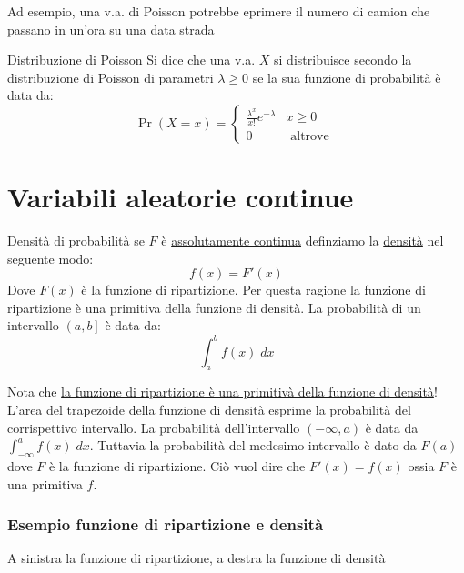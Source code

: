 Ad esempio, una v.a. di Poisson potrebbe eprimere il numero di camion che passano in un'ora su una data strada
\begin{definizione}{Distribuzione di Poisson}
	Si dice che una v.a. $ X $ si distribuisce secondo la distribuzione di Poisson di parametri $ \lambda \ge 0 $ se la sua funzione di probabilità è data da:
	\[
		\Pr \left(X = x\right) =
		\begin{cases}
			\displaystyle \frac{\lambda ^{x}}{x!} e^{-\lambda } & x \ge 0          \\
			0                                                   & \text{ altrove }
		\end{cases}
	\]
\end{definizione}
\section{Variabili aleatorie continue}
\begin{definizione}{Densità di probabilità}
	se $ F $ è \underline{assolutamente continua} definziamo la \underline{densità} nel seguente modo:
	\[
		f\left(x\right) = F'\left(x\right)
	\]
	Dove $ F\left(x\right) $ è la funzione di ripartizione. Per questa ragione la funzione di ripartizione è una primitiva della funzione di densità. La probabilità di un intervallo $ \left(a, b\right] $ è data da:
	\[
		\int_{a}^{b} f(x) \; dx
	\]
\end{definizione}
Nota che \underline{la funzione di ripartizione è una primitivà della funzione di densità}! L'area del trapezoide della funzione di densità esprime la probabilità del corrispettivo intervallo. La probabilità dell'intervallo $ \left(-\infty, a\right) $ è data da $ \int_{-\infty }^{a} f(x) \; dx $. Tuttavia la probabilità del medesimo intervallo è dato da $ F\left(a\right) $ dove $ F $ è la funzione di ripartizione. Ciò vuol dire che $ F'\left(x\right) = f\left(x\right) $ ossia $ F $ è una primitiva $ f $.
\vskip3mm
\subsubsection*{Esempio funzione di ripartizione e densità}
A sinistra la funzione di ripartizione, a destra la funzione di densità

